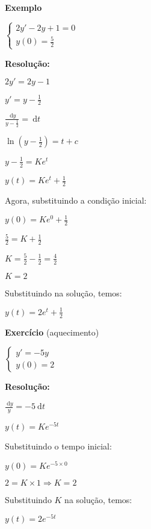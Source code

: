 \documentclass[a4paper]{article}
\newcommand{\ud}{\mathrm{\ d}}
\begin{document}
\newpage
\begin{multicols}{2}
{\bf Exemplo}

$
\left\{
  \begin{array}{l}
    2y'-2y +1 =0\\
    y(0)=\frac{5}{2}
  \end{array}
\right.
$

\bigskip
{\bf Resolução:}

$2y' = 2y - 1$

$y' = y - \frac{1}{2}$

\smallskip

$\frac{\ud y}{y - \frac{1}{2}} = \ud t$

\smallskip

$\ln \left(y - \frac{1}{2} \right) = t + c$

\smallskip

$y - \frac{1}{2}= K e^t$

\smallskip

$y(t) = K e^t + \frac{1}{2}$

\smallskip

Agora, substituindo a condição inicial:

\smallskip

$y(0) = Ke^0 +\frac{1}{2}$

\smallskip

$\frac{5}{2} = K + \frac{1}{2}$

\smallskip

$K=\frac{5}{2}-\frac{1}{2} = \frac{4}{2}$

\smallskip

$K=2$

Substituindo na solução, temos:

$y(t) = 2e^t +\frac{1}{2}$

\hrulefill

{\bf Exercício} (aquecimento)

$
\left\{
  \begin{array}{l}
    y'=-5y\\
    y(0)=2
  \end{array}
\right.
$

{\bf Resolução:}

$\frac{\ud y}{y} = -5 \ud t$

$y(t) = Ke^{-5t}$

Substituindo o tempo inicial:

$y(0) = Ke^{-5 \times 0}$

$2 = K \times 1 \Rightarrow K= 2$

Substituindo $K$ na solução, temos:

$y(t) = 2e^{-5t}$
\end{multicols}
\end{document}
